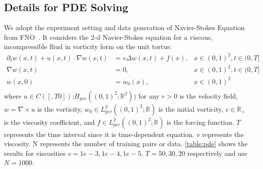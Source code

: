 \begin{table}[!h]
\vspace{-0.5cm}
\centering
\caption{Configuration of the OpenWebText experiments}
\label{table:owt}
\end{table}


\subsection{Details for PDE Solving}
We adopt the experiment setting and data generation of Navier-Stokes Equation from FNO~\citep{li2020fourier}. It considers the 2-d Navier-Stokes equation for a viscous, incompressible fliud in vorticity form on the unit tortus:
\begin{align}
    \partial_{t} w(x, t) + u(x, t) \cdot \nabla w(x, t) & = v \Delta w(x, t) + f(x), & x \in (0, 1)^2, t \in (0, T] \\
    \nabla w(x, t) & = 0, & x \in (0, 1)^2, t \in (0, T] \\
    w(x, 0) & = w_0(x), & x \in (0, 1)^2 \\
\end{align}
where $u \in C([, T0])$;$H_{per}((0, 1)^2; \mathbb{R}^2))$ for any $r>0$ is the velocity field, $w=\nabla \times u$ is the vorticity, $w_0 \in L^2_{per}((0, 1)^2; \mathbb{R})$ is the initial vorticity, $v \in \mathbb{R_{+}}$ is the viscosity coefficient, and $f \in L_{per}^2((0, 1)^2; \mathbb{R})$ is the forcing function. 
$T$ represents the time interval since it is time-dependent equation. $v$ represents the viscosity. N represents the number of training pairs or data. \cref{table:pde} shows the results for viscosities $v=1e-3, 1e-4, 1e-5$, $T=50, 30, 20$ respectively and use $N=1000$. 

